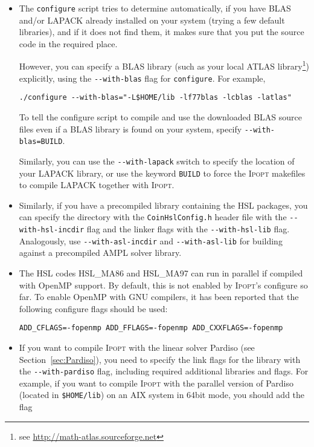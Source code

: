 \documentclass[10pt]{article}
\newcommand{\Ipopt}{\textsc{Ipopt}\xspace}
\begin{document}
\begin{itemize}
\item The {\tt configure} script tries to determine automatically, if
  you have BLAS and/or LAPACK already installed on your system (trying
  a few default libraries), and if it does not find them, it makes
  sure that you put the source code in the required place.

  However, you can specify a BLAS library (such as your local ATLAS
  library\footnote{see \url{http://math-atlas.sourceforge.net}})
  explicitly, using the \verb/--with-blas/ flag for {\tt configure}.
  For example,

  \verb|./configure --with-blas="-L$HOME/lib -lf77blas -lcblas -latlas"| %

  To tell the configure script to compile and use the downloaded BLAS
  source files even if a BLAS library is found on your system, specify
  \verb|--with-blas=BUILD|.

  Similarly, you can use the \verb/--with-lapack/ switch to specify
  the location of your LAPACK library, or use the keyword {\tt BUILD}
  to force the \Ipopt makefiles to compile LAPACK together with
  \Ipopt.

\item Similarly, if you have a precompiled library containing the
  HSL packages, you can specify the directory with the
  \texttt{CoinHslConfig.h} header file with the \verb|--with-hsl-incdir| flag and
  the linker flags with the \verb|--with-hsl-lib| flag. 
  Analogously, use \verb|--with-asl-incdir| and \verb|--with-asl-lib| for
  building against a precompiled AMPL solver library.
  
\item The HSL codes HSL\_MA86 and HSL\_MA97 can run in parallel if 
compiled with OpenMP support. By default, this is not enabled by 
\Ipopt's configure so far. To enable OpenMP with GNU compilers, it 
has been reported that the following configure flags should be used:

  \verb|ADD_CFLAGS=-fopenmp ADD_FFLAGS=-fopenmp ADD_CXXFLAGS=-fopenmp|

\item If you want to compile \Ipopt with the linear solver Pardiso
  (see Section~\ref{sec:Pardiso}), you need to specify the link flags
  for the library with the \verb|--with-pardiso| flag, including
  required additional libraries and flags.  For example, if you want
  to compile \Ipopt with the parallel version of Pardiso (located in
  {\tt \$HOME/lib}) on an AIX system in 64bit mode, you should add the
  flag


\end{itemize}
\end{document}
